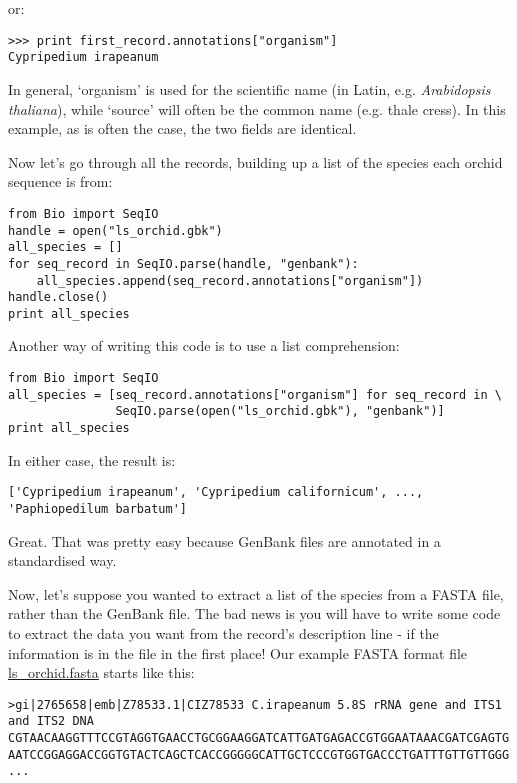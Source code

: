 \documentclass{report}
\begin{document}
\noindent or:

\begin{verbatim}
>>> print first_record.annotations["organism"]
Cypripedium irapeanum
\end{verbatim}

In general, `organism' is used for the scientific name (in Latin, e.g. \textit{Arabidopsis thaliana}),
while `source' will often be the common name (e.g. thale cress).  In this example, as is often the case,
the two fields are identical.  

Now let's go through all the records, building up a list of the species each orchid sequence is from:

\begin{verbatim}
from Bio import SeqIO
handle = open("ls_orchid.gbk")
all_species = []
for seq_record in SeqIO.parse(handle, "genbank"):
    all_species.append(seq_record.annotations["organism"])
handle.close()
print all_species
\end{verbatim}

Another way of writing this code is to use a list comprehension:

\begin{verbatim}
from Bio import SeqIO
all_species = [seq_record.annotations["organism"] for seq_record in \
               SeqIO.parse(open("ls_orchid.gbk"), "genbank")]
print all_species
\end{verbatim}

\noindent In either case, the result is:

\begin{verbatim}
['Cypripedium irapeanum', 'Cypripedium californicum', ..., 'Paphiopedilum barbatum']
\end{verbatim}

Great.  That was pretty easy because GenBank files are annotated in a standardised way.

Now, let's suppose you wanted to extract a list of the species from a FASTA file, rather than the GenBank file.  The bad news is you will have to write some code to extract the data you want from the record's description line - if the information is in the file in the first place!  Our example FASTA format file \href{http://biopython.org/DIST/docs/tutorial/examples/ls_orchid.fasta}{ls\_orchid.fasta} starts like this:

\begin{verbatim}
>gi|2765658|emb|Z78533.1|CIZ78533 C.irapeanum 5.8S rRNA gene and ITS1 and ITS2 DNA
CGTAACAAGGTTTCCGTAGGTGAACCTGCGGAAGGATCATTGATGAGACCGTGGAATAAACGATCGAGTG
AATCCGGAGGACCGGTGTACTCAGCTCACCGGGGGCATTGCTCCCGTGGTGACCCTGATTTGTTGTTGGG
...
\end{verbatim}
\end{document}

